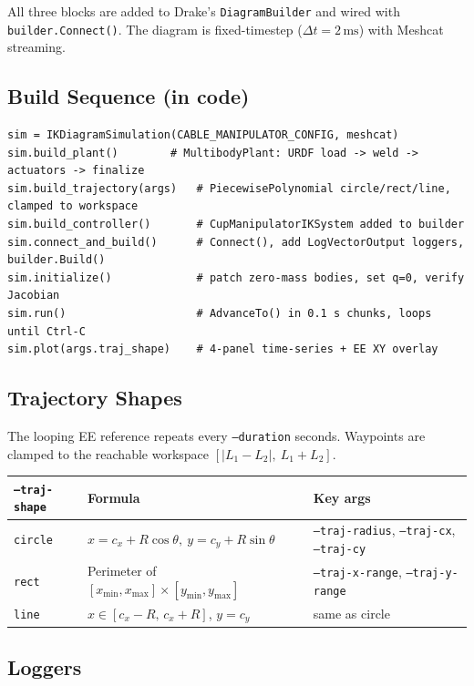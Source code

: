 \documentclass[11pt, a4paper]{article}
\begin{document}
All three blocks are added to Drake's \texttt{DiagramBuilder} and wired
with \texttt{builder.Connect()}.  The diagram is fixed-timestep
($\Delta t = 2\,\text{ms}$) with Meshcat streaming.

\subsection{Build Sequence (in code)}

\begin{lstlisting}
sim = IKDiagramSimulation(CABLE_MANIPULATOR_CONFIG, meshcat)
sim.build_plant()        # MultibodyPlant: URDF load -> weld -> actuators -> finalize
sim.build_trajectory(args)   # PiecewisePolynomial circle/rect/line, clamped to workspace
sim.build_controller()       # CupManipulatorIKSystem added to builder
sim.connect_and_build()      # Connect(), add LogVectorOutput loggers, builder.Build()
sim.initialize()             # patch zero-mass bodies, set q=0, verify Jacobian
sim.run()                    # AdvanceTo() in 0.1 s chunks, loops until Ctrl-C
sim.plot(args.traj_shape)    # 4-panel time-series + EE XY overlay
\end{lstlisting}

\subsection{Trajectory Shapes}

The looping EE reference repeats every \texttt{--duration} seconds.
Waypoints are clamped to the reachable workspace $[|L_1-L_2|,\ L_1+L_2]$.

\begin{center}
\begin{tabular}{lll}
\toprule
\texttt{--traj-shape} & Formula & Key args \\
\midrule
\texttt{circle} & $x = c_x + R\cos\theta,\ y = c_y + R\sin\theta$ &
                  \texttt{--traj-radius}, \texttt{--traj-cx}, \texttt{--traj-cy} \\
\texttt{rect}   & Perimeter of $[x_{\min},x_{\max}]\times[y_{\min},y_{\max}]$ &
                  \texttt{--traj-x-range}, \texttt{--traj-y-range} \\
\texttt{line}   & $x \in [c_x - R,\,c_x + R]$, $y = c_y$ &
                  same as circle \\
\bottomrule
\end{tabular}
\end{center}

\subsection{Loggers}
\end{document}
